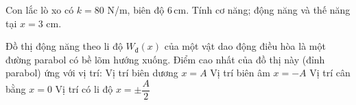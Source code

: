 \begin{bt}
Con lắc lò xo có $k=80$ N/m, biên độ $6\,\text{cm}$. Tính cơ năng; động năng và thế năng tại $x=3$ cm.
\end{bt}


\begin{ex}
Đồ thị động năng theo li độ $W_{\text{đ}}(x)$ của một vật dao động điều hòa là một đường parabol có bề lõm hướng xuống. Điểm cao nhất của đồ thị này (đỉnh parabol) ứng với vị trí:
\choice
{Vị trí biên dương $x = A$}
{Vị trí biên âm $x = -A$}
{\True Vị trí cân bằng $x = 0$}
{Vị trí có li độ $x = \pm \dfrac{A}{2}$}
\end{ex}

